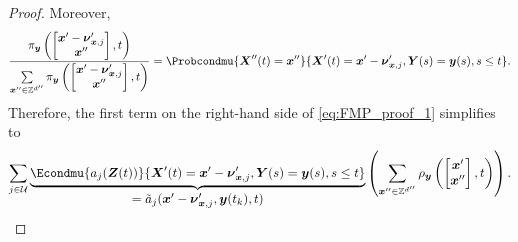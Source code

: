 \begin{proof}
    Moreover,
    \begin{align*}
        \frac{ \pi_{\boldsymbol{y}} \left( \begin{bmatrix} \boldsymbol{x}' - \boldsymbol{\nu}_{\boldsymbol{x}, j}' \\ \boldsymbol{x}'' \end{bmatrix}, t \right) }{ \sum\limits_{\boldsymbol{x}'' \in \mathbb{Z}^{d''}} \pi_{\boldsymbol{y}} \left( \begin{bmatrix} \boldsymbol{x}' - \boldsymbol{\nu}_{\boldsymbol{x}, j}' \\ \boldsymbol{x}'' \end{bmatrix}, t \right) } = \Probcondmu{ \boldsymbol{X}''(t) = \boldsymbol{x}''}{ \boldsymbol{X}'(t) =  \boldsymbol{x}' - \boldsymbol{\nu}_{\boldsymbol{x}, j}'  , \boldsymbol{Y}(s) = \boldsymbol{y}(s) , s \leq t }.
    \end{align*}
    Therefore, the first term on the right-hand side of \eqref{eq:FMP_proof_1} simplifies to 
    \begin{align*}
        \sum_{j \in \mathcal{U}} \underbrace{\Econdmu{a_j (\boldsymbol{Z}(t))}{ \boldsymbol{X}'(t) = \boldsymbol{x}'-\boldsymbol{\nu}_{\boldsymbol{x}, j}' , \boldsymbol{Y}(s) = \boldsymbol{y}(s), s \leq t}}_{\textstyle = \Tilde{a}_j (\boldsymbol{x}'-\boldsymbol{\nu}_{\boldsymbol{x}, j}', \boldsymbol{y}(t_k), t) } \left( \sum_{\boldsymbol{x}'' \in \mathbb{Z}^{d''}} \rho_{\boldsymbol{y}} \left( \begin{bmatrix} \boldsymbol{x}' \\ \boldsymbol{x}'' \end{bmatrix}, t \right) \right).
    \end{align*}
    

\end{proof}
